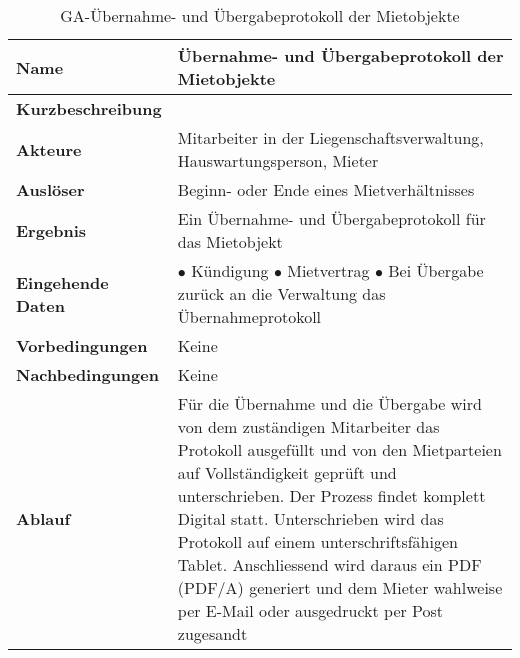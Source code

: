 \begin{table}[H]
  \centering
  \settowidth{}
  \setlength\extrarowheight{2pt}
  \begin{tabulary}{1.0\textwidth}{|a|m{12cm}|}
    \hline
    \textbf{Name}& Übernahme- und Übergabeprotokoll der Mietobjekte\\
    \hline 
    \textbf{Kurzbeschreibung} &\\
    \hline
    \textbf{Akteure} & Mitarbeiter in der Liegenschaftsverwaltung, Hauswartungsperson, Mieter\\
    \hline
    \textbf{Auslöser} & Beginn- oder Ende eines Mietverhältnisses\\
    \hline
    \textbf{Ergebnis} & Ein Übernahme- und Übergabeprotokoll für das Mietobjekt\\
    \hline
    \textbf{Eingehende Daten} &  
      $\bullet$ Kündigung \newline
      $\bullet$ Mietvertrag \newline
      $\bullet$ Bei Übergabe zurück an die Verwaltung das Übernahmeprotokoll\\
    \hline
    \textbf{Vorbedingungen} & Keine\\
    \hline
    \textbf{Nachbedingungen} & Keine\\
    \hline
    \textbf{Ablauf} & Für die Übernahme und die Übergabe wird von dem zuständigen Mitarbeiter das Protokoll ausgefüllt und von den Mietparteien auf Vollständigkeit geprüft und unterschrieben. Der Prozess findet komplett Digital statt. Unterschrieben wird das Protokoll auf einem unterschriftsfähigen Tablet. Anschliessend wird daraus ein PDF (PDF/A) generiert und dem Mieter wahlweise per E-Mail oder ausgedruckt per Post zugesandt\\
    \hline
  \end{tabulary}
  \caption{GA-Übernahme- und Übergabeprotokoll der Mietobjekte}
\end{table}

